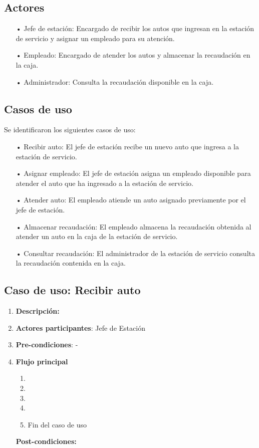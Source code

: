 \documentclass[12pt,a4paper,titlepage,oneside]{article}
\begin{document}
\subsection{Actores}
\begin{enumerate}
\item[•] Jefe de estación: Encargado de recibir los autos que ingresan en la estación de servicio y asignar un empleado para su atención.
\item[•] Empleado: Encargado de atender los autos y almacenar la recaudación en la caja.
\item[•] Administrador: Consulta la recaudación disponible en la caja.
\end{enumerate}

\subsection{Casos de uso}
Se identificaron los siguientes casos de uso:

\begin{enumerate}
\item[•] Recibir auto: El jefe de estación recibe un nuevo auto que ingresa a la estación de servicio.
\item[•] Asignar empleado: El jefe de estación asigna un empleado disponible para atender el auto que ha ingresado a la estación de servicio.
\item[•] Atender auto: El empleado atiende un auto asignado previamente por el jefe de estación.
\item[•] Almacenar recaudación: El empleado almacena la recaudación obtenida al atender un auto en la caja de la estación de servicio.
\item[•] Consultar recaudación: El administrador de la estación de servicio consulta la recaudación contenida en la caja.
\end{enumerate}

\subsection{Caso de uso: Recibir auto}

\begin{enumerate}
\item \textbf{Descripción:} 
\item \textbf{Actores participantes}: Jefe de Estación
\item \textbf{Pre-condiciones}: -
\item \textbf{Flujo principal}
\begin{enumerate}
\item 
\item 
\item 
\item 
\item Fin del caso de uso
\end{enumerate}
\textbf{Post-condiciones:} 
\end{enumerate}
\end{document}
